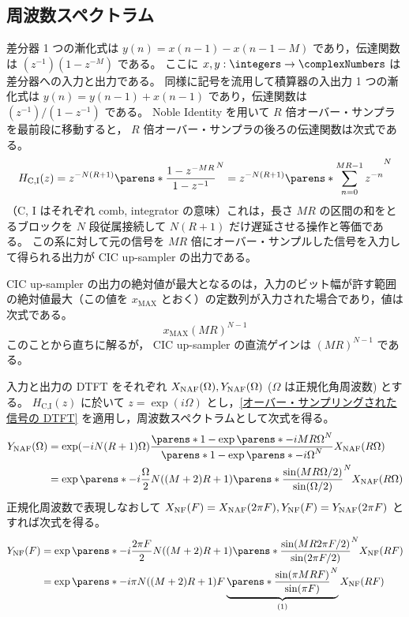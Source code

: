     \subsection{周波数スペクトラム}
        \label{CIC up-sampler の周波数スペクトラム}
        差分器 1 つの漸化式は $y(n) = x(n-1) - x(n-1-M)$ であり，伝達関数は $(z^{-1})(1-z^{-M})$ である。
        ここに $x,y:\integers\to\complexNumbers$ は差分器への入力と出力である。
        同様に記号を流用して積算器の入出力 1 つの漸化式は $y(n) = y(n-1) + x(n-1)$ であり，伝達関数は $(z^{-1})/(1-z^{-1})$ である。
        Noble Identity を用いて $R$ 倍オーバー・サンプラを最前段に移動すると， $R$ 倍オーバー・サンプラの後ろの伝達関数は次式である。
        \[ H_\text{C,I}(z) = z^{-N(R+1)}\parens*{\frac{1-z^{-MR}}{1-z^{-1}}}^N = z^{-N(R+1)}\parens*{\sum_{n=0}^{MR-1} z^{-n}}^N \]
        （C, I はそれぞれ comb, integrator の意味）これは，長さ $MR$ の区間の和をとるブロックを $N$ 段従属接続して $N(R+1)$ だけ遅延させる操作と等価である。
        この系に対して元の信号を $MR$ 倍にオーバー・サンプルした信号を入力して得られる出力が CIC up-sampler の出力である。
        \par
        CIC up-sampler の出力の絶対値が最大となるのは，入力のビット幅が許す範囲の絶対値最大（この値を $x_\text{MAX}$ とおく）の定数列が入力された場合であり，値は次式である。
        \begin{equation}
            x_\text{MAX}(MR)^{N-1}
            \label{equation:CIC up-sampler の出力の絶対値の最大値}
        \end{equation}
        このことから直ちに解るが， CIC up-sampler の直流ゲインは $(MR)^{N-1}$ である。
        \par
        入力と出力の DTFT をそれぞれ $X_\text{NAF}(\Omega), Y_\text{NAF}(\Omega)$ ($\Omega$ は正規化角周波数) とする。
        $H_\text{C,I}(z)$ に於いて $z = \exp(i\Omega)$ とし，\ref{オーバー・サンプリングされた信号の DTFT} を適用し，周波数スペクトラムとして次式を得る。
        \begin{align*}
            \YNAF(\Omega) &= \exp(-iN(R+1)\Omega)\frac{\parens*{1-\exp\parens*{-iMR\Omega}}^N}{\parens*{1-\exp\parens*{-i\Omega}}^N}\XNAF(R\Omega) \\
            &= \exp\parens*{-i\frac{\Omega}{2}N((M+2)R+1)}\parens*{\frac{\sin(MR\Omega/2)}{\sin(\Omega/2)}}^N \XNAF(R\Omega)
        \end{align*}
        正規化周波数で表現しなおして $X_\text{NF}(F) = X_\text{NAF}(2\pi F), Y_\text{NF}(F) = Y_\text{NAF}(2\pi F)$ とすれば次式を得る。
        \begin{align}
            \YNF(F) &= \exp\parens*{-i\frac{2\pi F}{2}N((M+2)R+1)}\parens*{\frac{\sin(MR 2\pi F/2)}{\sin(2\pi F/2)}}^N \XNF(RF) \nonumber \\
            &= \exp\parens*{-i\pi N((M+2)R+1)F}\underbrace{\parens*{\frac{\sin(\pi MRF)}{\sin(\pi F)}}^N}_{(1)} \XNF(RF) \label{equation:CIC up-sampler の周波数スペクトラム}
        \end{align}
